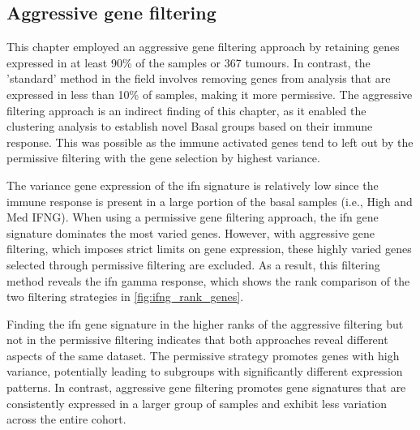 

\subsection*{Aggressive gene filtering}


This chapter employed an aggressive gene filtering approach by retaining genes expressed in at least 90\% of the samples or 367 tumours. In contrast, the 'standard' method in the field involves removing genes from analysis that are expressed in less than 10\% of samples, making it more permissive. The aggressive filtering approach is an indirect finding of this chapter, as it enabled the clustering analysis to establish novel Basal groups based on their immune response. This was possible as the immune activated genes tend to left out by the permissive filtering with the gene selection by highest variance. 

The variance gene expression of the \acrshort{ifn} signature is relatively low since the immune response is present in a large portion of the basal samples (i.e., High and Med IFNG). When using a permissive gene filtering approach, the \acrshort{ifn} gene signature dominates the most varied genes. However, with aggressive gene filtering, which imposes strict limits on gene expression, these highly varied genes selected through permissive filtering are excluded. As a result, this filtering method reveals the \acrlong{ifn} gamma response, which shows the rank comparison of the two filtering strategies in \cref{fig:ifng_rank_genes}.

Finding the \acrlong{ifn} gene signature in the higher ranks of the aggressive filtering but not in the permissive filtering indicates that both approaches reveal different aspects of the same dataset. The permissive strategy promotes genes with high variance, potentially leading to subgroups with significantly different expression patterns. In contrast, aggressive gene filtering promotes gene signatures that are consistently expressed in a larger group of samples and exhibit less variation across the entire cohort.

